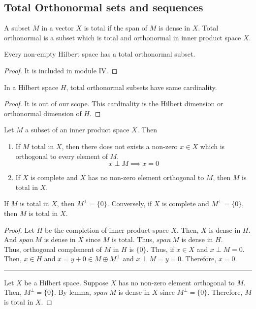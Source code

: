 \subsection{Total Orthonormal sets and sequences}
\begin{definition}
	A subset $M$ in a vector $X$ is total if the span of $M$ is dense in $X$.
	Total orthonormal is a subset which is total and orthonormal in inner product space $X$.
\end{definition}

\begin{important}
	Every non-empty Hilbert space has a total orthonormal subset.
\end{important}
\begin{proof}
	It is included in module IV.
\end{proof}

\begin{important}
	In a Hilbert space $H$, total orthonormal subsets have same cardinality. 
\end{important}
\begin{proof}
	It is out of our scope.
	This cardinality is the Hilbert dimension or orthonormal dimension of $H$.
\end{proof}

\begin{theorem}[duality]
	Let $M$ a subset of an inner product space $X$.
	Then
	\begin{enumerate}
		\item If $M$ total in $X$, then there does not exists a non-zero $x \in X$ which is orthogonal to every element of $M$.
			\[ x \perp M \implies x = 0 \]
		\item If $X$ is complete and $X$ has no non-zero element orthogonal to $M$, then $M$ is total in $X$.
	\end{enumerate}
\end{theorem}
\begin{important}
	If $M$ is total in $X$, then $M^\perp = \{ 0 \}$.
	Conversely, if $X$ is complete and $M^\perp = \{ 0 \}$, then $M$ is total in $X$.
\end{important}
\begin{proof}
	Let $H$ be the completion of inner product space $X$.
	Then, $X$ is dense in $H$.
	And $span\ M$ is dense in $X$ since $M$ is total.	
	Thus, $span\ M$ is dense in $H$.\\

	Thus, orthogonal complement of $M$ in $H$ is $\{ 0 \}$.
	Thus, if $x \in X$ and $x \perp M = 0$.
	Then, $x \in H$ and $x = y+0 \in M \oplus M^\perp$ and $x \perp M = y = 0$.
	Therefore, $x = 0$.\\

	\hrule \vspace{1em}

	Let $X$ be a Hilbert space.
	Suppose $X$ has no non-zero element orthogonal to $M$.
	Then, $M^\perp = \{ 0 \}$.
	By lemma, $span\ M$ is dense in $X$ since $M^\perp = \{ 0 \}$.
	Therefore, $M$ is total in $X$.
\end{proof}

